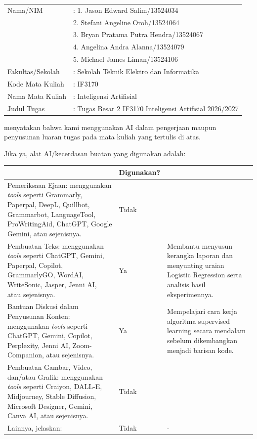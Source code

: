 \noindent
\begin{tabular}{@{}l l@{}}
	Nama/NIM            & : 1. Jason Edward Salim/13524034 \\
	                    & \phantom{:} 2. Stefani Angeline Oroh/13524064 \\
	                    & \phantom{:} 3. Bryan Pratama Putra Hendra/13524067 \\
	                    & \phantom{:} 4. Angelina Andra Alanna/13524079 \\
	                    & \phantom{:} 5. Michael James Liman/13524106 \\
	Fakultas/Sekolah    & : Sekolah Teknik Elektro dan Informatika \\
	Kode Mata Kuliah    & : IF3170 \\
	Nama Mata Kuliah    & : Inteligensi Artifisial \\
	Judul Tugas         & : Tugas Besar 2 IF3170 Inteligensi Artifisial 2026/2027 \\
\end{tabular}

\medskip
\noindent menyatakan bahwa kami menggunakan AI dalam pengerjaan maupun penyusunan
luaran tugas pada mata kuliah yang tertulis di atas.

\medskip
\noindent Jika ya, alat AI/kecerdasan buatan yang digunakan adalah:

\begin{center}
\small
\renewcommand{\arraystretch}{1.25}
\begin{tabular}{|>{\raggedright\arraybackslash}p{5.3cm}|>{\centering\arraybackslash}p{2.4cm}|>{\raggedright\arraybackslash}p{5.4cm}|}
	\hline
	\multicolumn{1}{|c|}{\textbf{Lingkup Pekerjaan}} & \textbf{Digunakan?} & \multicolumn{1}{c|}{\textbf{Tingkat Penggunaan}} \\
	\hline
	Pemeriksaan Ejaan: menggunakan \textit{tools} seperti Grammarly, Paperpal,
	DeepL, Quillbot, Grammarbot, LanguageTool, ProWritingAid, ChatGPT, Google
	Gemini, atau sejenisnya.
	& Tidak
	& \\
	\hline
	Pembuatan Teks: menggunakan \textit{tools} seperti ChatGPT, Gemini, Paperpal,
	Copilot, GrammarlyGO, WordAI, WriteSonic, Jasper, Jenni AI, atau sejenisnya.
	& Ya
	& Membantu menyusun kerangka laporan dan menyunting uraian Logistic Regression serta analisis hasil eksperimennya. \\
	\hline
	Bantuan Diskusi dalam Penyusunan Konten: menggunakan \textit{tools} seperti
	ChatGPT, Gemini, Copilot, Perplexity, Jenni AI, Zoom-Companion, atau
	sejenisnya.
	& Ya
	& Mempelajari cara kerja algoritma supervised learning secara mendalam sebelum dikembangkan menjadi barisan kode. \\
	\hline
	Pembuatan Gambar, Video, dan/atau Grafik: menggunakan \textit{tools} seperti
	Craiyon, DALL-E, Midjourney, Stable Diffusion, Microsoft Designer, Gemini,
	Canva AI, atau sejenisnya.
	& Tidak
	& \\
	\hline
	Lainnya, jelaskan:
	& Tidak
	& - \\
	\hline
\end{tabular}
\end{center}

